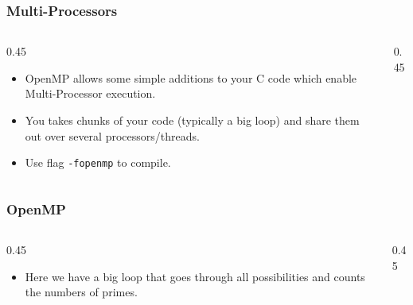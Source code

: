 
\begin{frame}[fragile]
\frametitle{Multi-Processors}
\begin{columns}[T]

\pause
\begin{column}{0.45\textwidth}
\begin{itemize}[<+->]
\item OpenMP allows some simple additions to your C code
which enable Multi-Processor execution.
\item You takes chunks of your code (typically a big loop)
and share them out over several processors/threads.
\item Use flag \verb^-fopenmp^ to compile.
\end{itemize}
\end{column}

\pause
\begin{column}{0.45\textwidth}

\end{column}


\end{columns}
\end{frame}


\begin{frame}[fragile]
\frametitle{OpenMP}
\begin{columns}[T]

\pause
\begin{column}{0.45\textwidth}
\begin{itemize}[<+->]
\item Here we have a big loop that goes through all possibilities
and counts the numbers of primes.
\end{itemize}
\end{column}

\pause
\begin{column}{0.45\textwidth}

\end{column}


\end{columns}
\end{frame}


